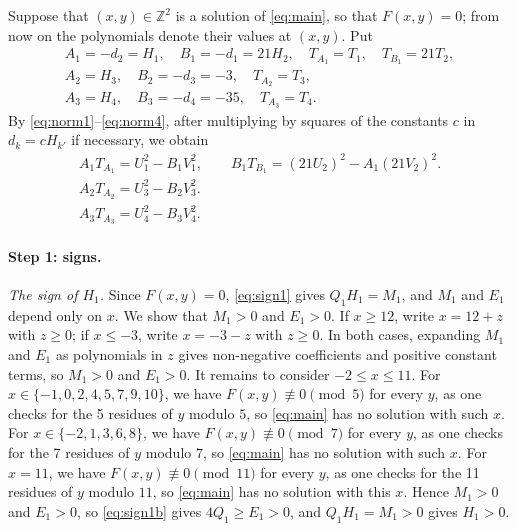 \documentclass[11pt]{article}
\newcommand{\Z}{\mathbb{Z}}
\begin{document}
Suppose that $(x,y)\in\Z^2$ is a solution of \eqref{eq:main}, so that $F(x,y)=0$; from now on the polynomials denote their values at $(x,y)$. Put
\begin{gather*}
A_{1}=-d_{2}=H_{1},\quad B_{1}=-d_{1}=21H_{2},\quad T_{A_{1}}=T_{1},\quad T_{B_{1}}=21T_{2},\\
A_{2}=H_{3},\quad B_{2}=-d_{3}=-3,\quad T_{A_{2}}=T_{3},\\
A_{3}=H_{4},\quad B_{3}=-d_{4}=-35,\quad T_{A_{3}}=T_{4}.
\end{gather*}
By \eqref{eq:norm1}--\eqref{eq:norm4}, after multiplying by squares of the constants $c$ in $d_k=cH_{k'}$ if necessary, we obtain
\begin{align}
A_{1}T_{A_{1}}=U_{1}^2-B_{1}V_{1}^2,\qquad B_{1}T_{B_{1}}=(21U_{2})^2-A_{1}(21V_{2})^2.\label{eq:AB1}\\
A_{2}T_{A_{2}}=U_{3}^2-B_{2} V_{3}^2.\label{eq:AB2}\\
A_{3}T_{A_{3}}=U_{4}^2-B_{3} V_{4}^2.\label{eq:AB3}
\end{align}

\paragraph{Step 1: signs.} \emph{The sign of $H_{1}$.} Since $F(x,y)=0$, \eqref{eq:sign1} gives $Q_{1}H_{1}=M_{1}$, and $M_{1}$ and $E_{1}$ depend only on $x$. We show that $M_{1}>0$ and $E_{1}>0$. If $x\geq12$, write $x=12+z$ with $z\geq0$; if $x\leq-3$, write $x=-3-z$ with $z\geq0$. In both cases, expanding $M_{1}$ and $E_{1}$ as polynomials in $z$ gives non-negative coefficients and positive constant terms, so $M_{1}>0$ and $E_{1}>0$. It remains to consider $-2\leq x\leq11$. For $x\in\{-1,\allowbreak 0,\allowbreak 2,\allowbreak 4,\allowbreak 5,\allowbreak 7,\allowbreak 9,\allowbreak 10\}$, we have $F(x,y)\not\equiv0\pmod{5}$ for every $y$, as one checks for the 5 residues of $y$ modulo $5$, so \eqref{eq:main} has no solution with such $x$. For $x\in\{-2,\allowbreak 1,\allowbreak 3,\allowbreak 6,\allowbreak 8\}$, we have $F(x,y)\not\equiv0\pmod{7}$ for every $y$, as one checks for the 7 residues of $y$ modulo $7$, so \eqref{eq:main} has no solution with such $x$. For $x=11$, we have $F(x,y)\not\equiv0\pmod{11}$ for every $y$, as one checks for the 11 residues of $y$ modulo $11$, so \eqref{eq:main} has no solution with this $x$. Hence $M_{1}>0$ and $E_{1}>0$, so \eqref{eq:sign1b} gives $4Q_{1}\geq E_{1}>0$, and $Q_{1}H_{1}=M_{1}>0$ gives $H_{1}>0$.
\end{document}
